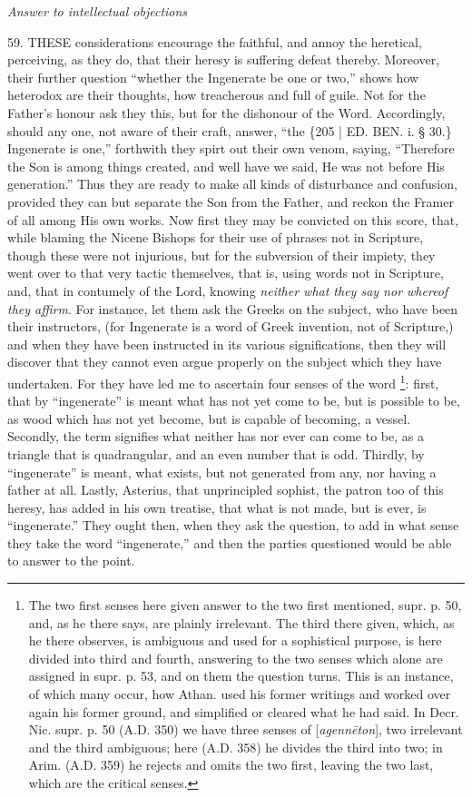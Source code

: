 
\emph{Answer
to intellectual objections}

59. THESE
considerations encourage the faithful, and annoy the heretical,
perceiving, as they do, that their heresy is suffering defeat thereby.
Moreover, their further question ``whether the Ingenerate be one or
two,'' shows how heterodox are their thoughts, how treacherous and full
of guile. Not for the Father's honour ask they this, but for the
dishonour of the Word. Accordingly, should any one, not aware of their
craft, answer, ``the \{205 | ED.
BEN.
i. § 30.\} Ingenerate is one,'' forthwith they spirt out their own
venom, saying, ``Therefore the Son is among things created, and well
have we said, He was not before His generation.'' Thus they are ready
to make all kinds of disturbance and confusion, provided they can but
separate the Son from the Father, and reckon the Framer of all among
His own works. Now first they may be convicted on this score, that,
while blaming the Nicene Bishops for their use of phrases not in
Scripture, though these were not injurious, but for the subversion of
their impiety, they went over to that very tactic themselves, that is,
using words not in Scripture, and, that in contumely of the Lord,
knowing \emph{neither what they say nor whereof they affirm}. For
instance, let them ask the Greeks on the subject, who have been their
instructors, (for Ingenerate is a word of Greek invention, not of
Scripture,) and when they have been instructed in its various
significations, then they will discover that they cannot even argue
properly on the subject which they have undertaken. For they have led
me to ascertain four senses of the word \footnote{The two first senses here given answer to the two first mentioned,
supr. p. 50, and, as he there says, are plainly irrelevant. The third
there given, which, as he there observes, is ambiguous and used for a
sophistical purpose, is here divided into third and fourth, answering
to the two senses which alone are assigned in supr. p. 53, and on them
the question turns. This is an instance, of which many occur, how
Athan. used his former writings and worked over again his former
ground, and simplified or cleared what he had said. In Decr. Nic. supr.
p. 50 (A.D.
350) we have three senses of [\emph{agenn\={e}ton}], two irrelevant
and the third ambiguous; here (A.D.
358) he divides the third into two; in Arim. (A.D.
359) he rejects and omits the two first, leaving the two last, which
are the critical senses.}: first, that by ``ingenerate'' is meant what has not yet come to
be, but is possible to be, as wood which has not yet become, but is
capable of becoming, a vessel. Secondly, the term signifies what
neither has nor ever can come to be, as a triangle that is
quadrangular, and an even number that is odd. Thirdly, by ``ingenerate''
is meant, what exists, but not generated from any, nor having a father
at all. Lastly, Asterius, that unprincipled sophist, the patron too of
this heresy, has added in his own treatise, that what is not made, but
is ever, is ``ingenerate.'' They ought then, when they ask the question,
to add in what sense they take the word ``ingenerate,'' and then the
parties questioned would be able to answer to the point.

